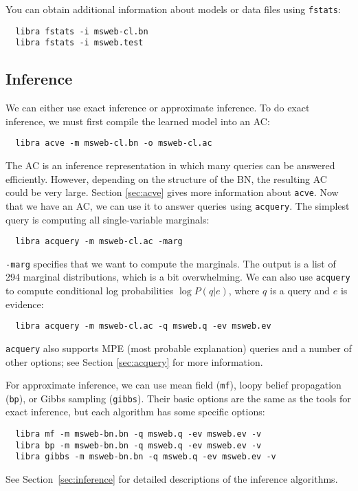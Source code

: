 \documentclass[11pt]{article}
\begin{document}
You can obtain additional information about models or data files using
{\tt fstats}:
\begin{verbatim}
  libra fstats -i msweb-cl.bn
  libra fstats -i msweb.test
\end{verbatim}

\subsection{Inference}

We can either use exact inference or approximate inference. To do
exact inference, we must first compile the learned model into an AC:
\begin{verbatim}
  libra acve -m msweb-cl.bn -o msweb-cl.ac
\end{verbatim}
The AC is an inference representation in which many queries can be
answered efficiently.  However, depending on the structure of the BN,
the resulting AC could be very large.  Section \ref{sec:acve} gives
more information about {\tt acve}.  Now that we have an AC, we can use
it to answer queries using {\tt acquery}.  The simplest query is
computing all single-variable marginals:
\begin{verbatim}
  libra acquery -m msweb-cl.ac -marg
\end{verbatim}

{\tt -marg} specifies that we want to compute the marginals.
The output is a list of 294 marginal distributions, which is a
bit overwhelming.   We can also use {\tt acquery} to compute
conditional log probabilities $\log P(q | e)$, where $q$ is a query
and $e$ is evidence:
\begin{verbatim}
  libra acquery -m msweb-cl.ac -q msweb.q -ev msweb.ev
\end{verbatim}
{\tt acquery} also supports MPE (most probable explanation) queries
and a number of other options; see Section \ref{sec:acquery} for more
information.

For approximate inference, we can use mean field ({\tt mf}),
loopy belief propagation ({\tt bp}), or Gibbs sampling ({\tt gibbs}).
Their basic options are the same as the tools for exact inference,
but each algorithm has some specific options:
\begin{verbatim}
  libra mf -m msweb-bn.bn -q msweb.q -ev msweb.ev -v
  libra bp -m msweb-bn.bn -q msweb.q -ev msweb.ev -v
  libra gibbs -m msweb-bn.bn -q msweb.q -ev msweb.ev -v
\end{verbatim}

See Section~\ref{sec:inference} for detailed descriptions of the
inference algorithms.
\end{document}
